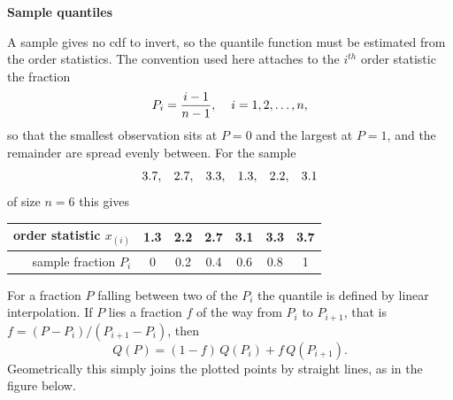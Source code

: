 \documentclass[11pt,a4paper]{article}
\theoremstyle{definition}
\begin{document}
\begin{center}
\textbf{Sample quantiles}
\end{center}

A sample gives no cdf to invert, so the quantile function must be estimated from
the order statistics. The convention used here attaches to the $i^{th}$ order
statistic the fraction
$$P_i=\dfrac{i-1}{n-1},\hspace{0.4cm}i=1,2,\dots,n,$$
so that the smallest observation sits at $P=0$ and the largest at $P=1$, and the
remainder are spread evenly between. For the sample
$$3.7,\hspace{0.3cm}2.7,\hspace{0.3cm}3.3,\hspace{0.3cm}1.3,\hspace{0.3cm}2.2,\hspace{0.3cm}3.1$$
of size $n=6$ this gives

\begin{table}[H]
\centering
\begin{tabular}{r|cccccc}
order statistic $x_{(i)}$ &1.3&2.2&2.7&3.1&3.3&3.7\\
\hline
sample fraction $P_i$ &0&0.2&0.4&0.6&0.8&1\\
\end{tabular}
\end{table}

For a fraction $P$ falling between two of the $P_i$ the quantile is defined by
linear interpolation. If $P$ lies a fraction $f$ of the way from $P_i$ to
$P_{i+1}$, that is $f=\left(P-P_i\right)/\left(P_{i+1}-P_i\right)$, then
$$Q(P)=(1-f)\,Q\left(P_i\right)+f\,Q\left(P_{i+1}\right).$$
Geometrically this simply joins the plotted points by straight lines, as in the
figure below.
\end{document}
